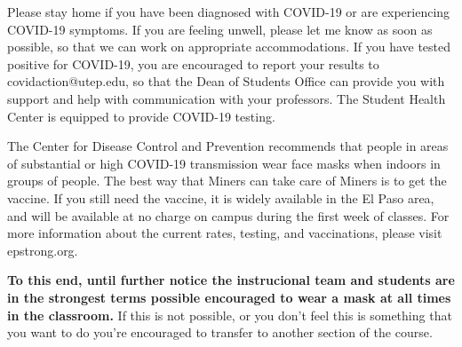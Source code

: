 \documentclass[12pt]{scrartcl}
\begin{document}
Please stay home if you have been diagnosed with COVID-19 or are experiencing COVID-19 symptoms. 
If you are feeling unwell, please let me know as soon as possible, so that we can work on appropriate accommodations. 
If you have tested positive for COVID-19, 
you are encouraged to report your results to covidaction@utep.edu, 
so that the Dean of Students Office can provide you with support and help with communication with your professors. 
The Student Health Center is equipped to provide COVID-19 testing. 
 
The Center for Disease Control and Prevention recommends that people 
in areas of substantial or high COVID-19 transmission wear face masks when indoors in groups of people. 
The best way that Miners can take care of Miners is to get the vaccine. 
If you still need the vaccine, it is widely available in the El Paso area, 
and will be available at no charge on campus during the first week of classes. 
For more information about the current rates, testing, and vaccinations, please visit epstrong.org.

\begin{tcolorbox}[colback=red!5,colframe=red!75!black,title=Masks in the classroom]
\textbf{To this end, until further notice the instrucional team and students are in the strongest terms possible
encouraged to wear a mask at all times in the classroom.}
If this is not possible, or you don't feel this is something that you want to do you're encouraged to transfer to another section of the course. 
\end{tcolorbox}
\end{document}
